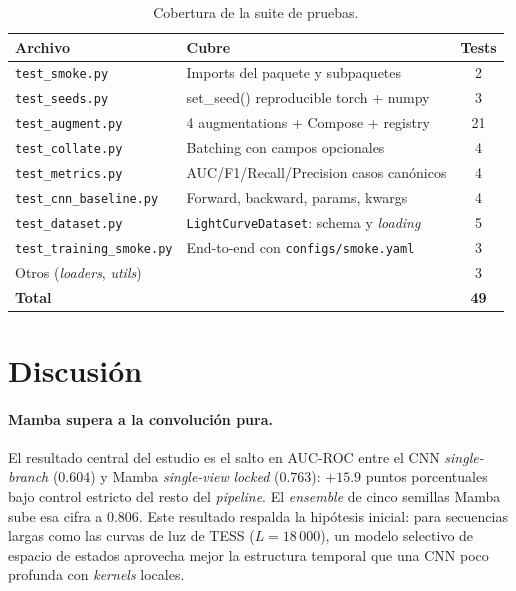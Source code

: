 \documentclass[11pt,a4paper]{article}
\begin{document}
\begin{table}[H]
\centering
\caption{Cobertura de la suite de pruebas.}
\label{tab:tests}
\begin{tabular}{llc}
\toprule
Archivo & Cubre & Tests \\
\midrule
\texttt{test\_smoke.py}           & Imports del paquete y subpaquetes        & 2 \\
\texttt{test\_seeds.py}           & set\_seed() reproducible torch + numpy   & 3 \\
\texttt{test\_augment.py}         & 4 augmentations + Compose + registry     & 21 \\
\texttt{test\_collate.py}         & Batching con campos opcionales           & 4 \\
\texttt{test\_metrics.py}         & AUC/F1/Recall/Precision casos canónicos  & 4 \\
\texttt{test\_cnn\_baseline.py}   & Forward, backward, params, kwargs        & 4 \\
\texttt{test\_dataset.py}         & \texttt{LightCurveDataset}: schema y \textit{loading} & 5 \\
\texttt{test\_training\_smoke.py} & End-to-end con \texttt{configs/smoke.yaml}            & 3 \\
\addlinespace
Otros (\textit{loaders}, \textit{utils})  &                                  & 3 \\
\midrule
\textbf{Total}                    &                                          & \textbf{49} \\
\bottomrule
\end{tabular}
\end{table}


\section{Discusión}
\label{sec:discussion}

\paragraph{Mamba supera a la convolución pura.}
El resultado central del estudio es el salto en AUC-ROC entre el CNN
\textit{single-branch} ($0.604$) y Mamba \textit{single-view}
\textit{locked} ($0.763$): $+15.9$ puntos porcentuales bajo control
estricto del resto del \textit{pipeline}. El \textit{ensemble} de
cinco semillas Mamba sube esa cifra a $0.806$. Este resultado
respalda la hipótesis inicial: para secuencias largas como las curvas
de luz de TESS ($L = 18\,000$), un modelo selectivo de espacio de
estados aprovecha mejor la estructura temporal que una CNN poco
profunda con \textit{kernels} locales.
\end{document}
